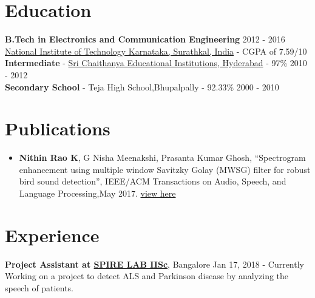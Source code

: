 \documentclass[margin, centered]{res}
\begin{document}
\begin{resume}

\section{Education}
\textbf{B.Tech in Electronics and Communication Engineering} \hfill 2012 - 2016 \\
\href{http://nitk.ac.in/}{National Institute of Technology Karnataka, Surathkal, India} - CGPA of 7.59/10 \\
\textbf{Intermediate} - \href{http://http://srichaitanya.net/}{Sri Chaithanya Educational
Institutions, Hyderabad}  - 97\% \hfill 2010 - 2012 \\
\textbf{Secondary School} - Teja High School,Bhupalpally - 92.33\% \hfill 2000 - 2010


\section{Publications}
\begin{itemize}[leftmargin=*]
\item \textbf{Nithin Rao K}, G Nisha Meenakshi, Prasanta Kumar Ghosh, ``Spectrogram enhancement using multiple window Savitzky Golay (MWSG) filter for robust bird sound detection'', IEEE/ACM Transactions on Audio, Speech, and Language Processing,May 2017. \href{http://ieeexplore.ieee.org/document/7933047/}{view here}
\end{itemize}
 
\section{Experience}

\textbf{Project Assistant at \href{http://spire.ee.iisc.ac.in/spire/}{SPIRE LAB IISc}}, Bangalore
\hfill  Jan 17, 2018 - Currently\\
Working on a project to detect ALS and Parkinson disease by analyzing the speech of patients.


\end{resume}
\end{document}
